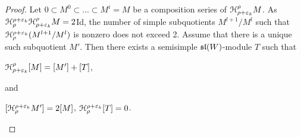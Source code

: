\documentclass[12pt]{amsart}
\theoremstyle{definition}\newtheorem{theorem}{Theorem}[section]
\theoremstyle{definition}\newtheorem{definition}[proposition]{Definition}
\theoremstyle{remark}\newtheorem{example}[proposition]{Example}
\begin{document}
\begin{proof} Let $0\subset M^0\subset...\subset M^i=M$ be a composition series of $\EuScript H^\rho_{\rho+\varepsilon_k}M$.
As $\EuScript H_\rho^{\rho+\varepsilon_k}\EuScript H^\rho_{\rho+\varepsilon_k}M=2$Id, the number of simple subquotients $M^{l+1}/M^l$ such that $\EuScript H_\rho^{\rho+\varepsilon_k}(M^{l+1}/M^l)$ is nonzero does not exceed 2. Assume that there is a unique such subquotient $M'$. Then there exists a semisimple $\frak{sl}(W)$-module $T$ such that \begin{center}$\EuScript H^\rho_{\rho+\varepsilon_k}[M]=[M']+[T]$,\end{center} and\begin{center} $[\EuScript H_\rho^{\rho+\varepsilon_k}M']=2[M]$, $\EuScript H_\rho^{\rho+\varepsilon_k}[T]=0$.\end{center}


\end{proof}
\end{document}
